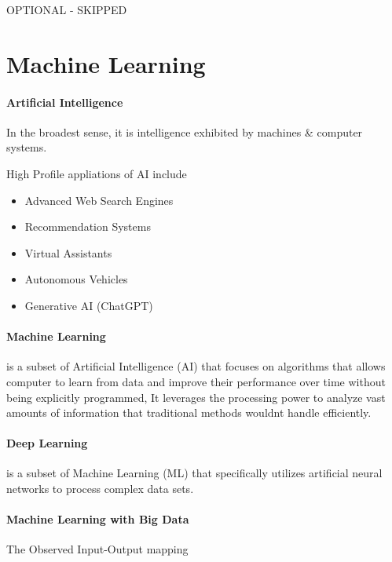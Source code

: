 \documentclass{article}
\theoremstyle{definition}
\theoremstyle{remark}
\begin{document}
OPTIONAL - SKIPPED

\section{Machine Learning}

\paragraph{Artificial Intelligence}
In the broadest sense, it is intelligence exhibited by machines \& computer systems.

High Profile appliations of AI include 

\begin{itemize}
    \item Advanced Web Search Engines
    \item Recommendation Systems
    \item Virtual Assistants
    \item Autonomous Vehicles
    \item Generative AI (ChatGPT)
\end{itemize}

\paragraph{Machine Learning} 
is a subset of Artificial Intelligence (AI) that focuses on algorithms that allows computer to learn from data and improve their performance over time without being explicitly programmed, It leverages the processing power to analyze vast amounts of information that traditional methods wouldnt handle efficiently.

\paragraph{Deep Learning}
is a subset of Machine Learning (ML) that specifically utilizes artificial neural networks to process complex data sets. 

\paragraph{Machine Learning with Big Data}

The Observed Input-Output mapping 
\end{document}
